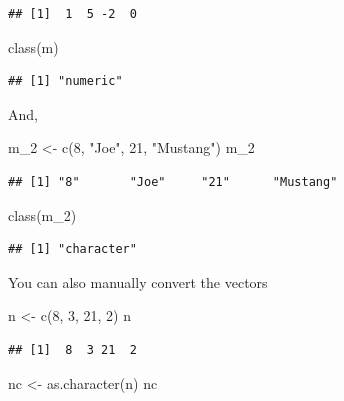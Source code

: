 \documentclass[
]{book}
\newenvironment{Shaded}{\begin{snugshade}}{\end{snugshade}}
\newcommand{\DecValTok}[1]{\textcolor[rgb]{0.00,0.00,0.81}{#1}}
\newcommand{\FunctionTok}[1]{\textcolor[rgb]{0.00,0.00,0.00}{#1}}
\newcommand{\NormalTok}[1]{#1}
\newcommand{\OtherTok}[1]{\textcolor[rgb]{0.56,0.35,0.01}{#1}}
\newcommand{\StringTok}[1]{\textcolor[rgb]{0.31,0.60,0.02}{#1}}
\begin{document}
\begin{verbatim}
## [1]  1  5 -2  0
\end{verbatim}

\begin{Shaded}
\begin{Highlighting}[]
\FunctionTok{class}\NormalTok{(m)}
\end{Highlighting}
\end{Shaded}

\begin{verbatim}
## [1] "numeric"
\end{verbatim}

And,

\begin{Shaded}
\begin{Highlighting}[]
\NormalTok{m\_2 }\OtherTok{\textless{}{-}} \FunctionTok{c}\NormalTok{(}\DecValTok{8}\NormalTok{, }\StringTok{"Joe"}\NormalTok{, }\DecValTok{21}\NormalTok{, }\StringTok{"Mustang"}\NormalTok{)}
\NormalTok{m\_2 }
\end{Highlighting}
\end{Shaded}

\begin{verbatim}
## [1] "8"       "Joe"     "21"      "Mustang"
\end{verbatim}

\begin{Shaded}
\begin{Highlighting}[]
\FunctionTok{class}\NormalTok{(m\_2)}
\end{Highlighting}
\end{Shaded}

\begin{verbatim}
## [1] "character"
\end{verbatim}

You can also manually convert the vectors

\begin{Shaded}
\begin{Highlighting}[]
\NormalTok{n }\OtherTok{\textless{}{-}} \FunctionTok{c}\NormalTok{(}\DecValTok{8}\NormalTok{, }\DecValTok{3}\NormalTok{, }\DecValTok{21}\NormalTok{, }\DecValTok{2}\NormalTok{)}
\NormalTok{n}
\end{Highlighting}
\end{Shaded}

\begin{verbatim}
## [1]  8  3 21  2
\end{verbatim}

\begin{Shaded}
\begin{Highlighting}[]
\NormalTok{nc }\OtherTok{\textless{}{-}} \FunctionTok{as.character}\NormalTok{(n)}
\NormalTok{nc}
\end{Highlighting}
\end{Shaded}
\end{document}
